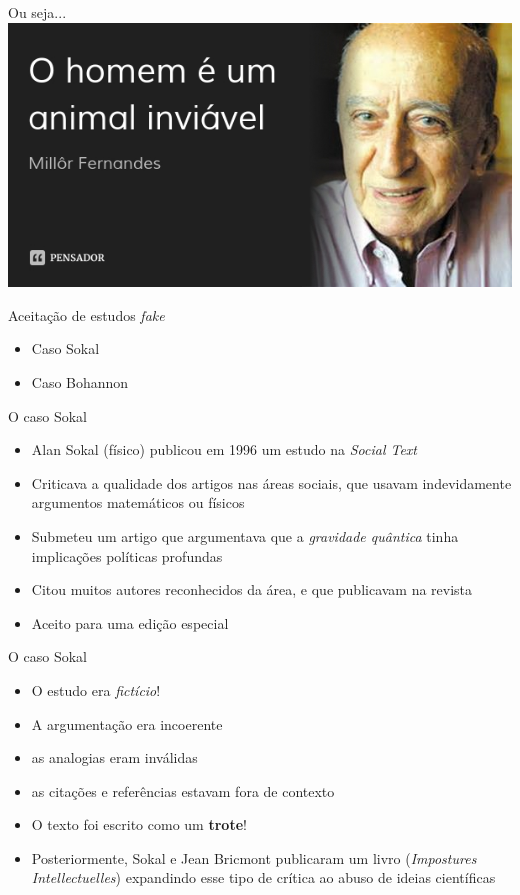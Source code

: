 \documentclass{beamer}
\begin{document}
\begin{frame}{Ou seja...}
  \includegraphics[width=\textwidth]{Etapas/millor}
\end{frame}

\begin{frame}{Aceitação de estudos {\em fake}}
  \begin{itemize}
  \item Caso Sokal
    \bigskip
  \item Caso Bohannon
  \end{itemize}
\end{frame}

\begin{frame}{O caso Sokal}
  \begin{itemize}
    \footnotesize
  \item Alan Sokal (físico) publicou em 1996 um estudo na {\em Social
      Text}
    \medskip
  \item Criticava a qualidade dos artigos nas áreas sociais, que
    usavam indevidamente argumentos matemáticos ou físicos
    \medskip
  \item Submeteu um artigo que argumentava que a {\em gravidade
      quântica} tinha implicações políticas profundas
    \medskip
  \item Citou muitos autores reconhecidos da área, e que publicavam na
    revista
    \medskip
  \item Aceito para uma edição especial
  \end{itemize}
\end{frame}

\begin{frame}{O caso Sokal}
  \begin{itemize}
    \footnotesize
  \item O estudo era {\em fictício}!
    \medskip
  \item A argumentação era incoerente
    \medskip
  \item as analogias eram inválidas
    \medskip
  \item as citações e referências estavam fora de contexto
    \medskip
  \item O texto foi escrito como um {\bf trote}!
    \medskip
  \item Posteriormente, Sokal e Jean Bricmont publicaram um livro
    ({\em Impostures Intellectuelles}) expandindo esse tipo de crítica
    ao abuso de ideias científicas
  \end{itemize}
\end{frame}
\end{document}
